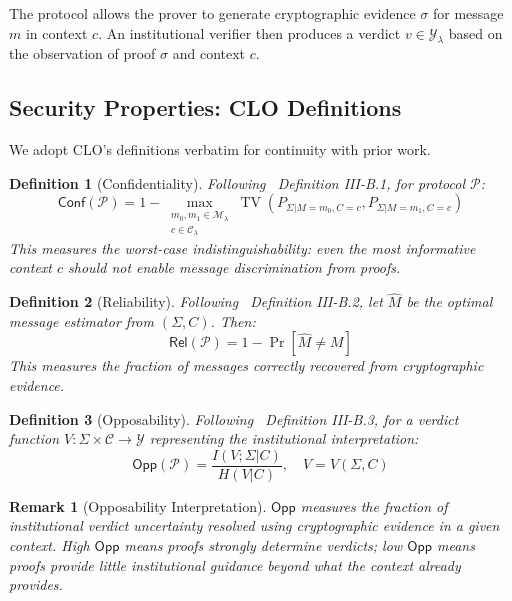 \documentclass{ieeeaccess}
\newcommand{\Conf}{\mathsf{Conf}}
\newcommand{\Rel}{\mathsf{Rel}}
\newcommand{\Opp}{\mathsf{Opp}}
\DeclareMathOperator{\TV}{TV}
\newtheorem{definition}{Definition}[subsection]
\newtheorem{remark}{Remark}[subsection]
\begin{document}
The protocol allows the prover to generate cryptographic evidence $\sigma$ for message $m$ in context $c$. An institutional verifier then produces a verdict $v \in \mathcal{Y}_\lambda$ based on the observation of proof $\sigma$ and context $c$.

\subsection{Security Properties: CLO Definitions}

We adopt CLO's definitions verbatim for continuity with prior work.

\begin{definition}[Confidentiality]\label{def:confidentiality}
Following~\cite{Minka2026CLO} Definition III-B.1, for protocol $\mathcal{P}$:
\begin{equation}
\Conf(\mathcal{P}) = 1 - \max_{\substack{m_0, m_1 \in \mathcal{M}_\lambda \\ c \in \mathcal{C}_\lambda}} 
    \TV(P_{\Sigma|M=m_0,C=c}, P_{\Sigma|M=m_1,C=c})
\end{equation}
This measures the worst-case indistinguishability: even the most informative context $c$ should not enable message discrimination from proofs.
\end{definition}

\begin{definition}[Reliability]\label{def:reliability}
Following~\cite{Minka2026CLO} Definition III-B.2, let $\hat{M}$ be the optimal message estimator from $(\Sigma, C)$. Then:
\begin{equation}
\Rel(\mathcal{P}) = 1 - \Pr[\hat{M} \neq M]
\end{equation}
This measures the fraction of messages correctly recovered from cryptographic evidence.
\end{definition}

\begin{definition}[Opposability]\label{def:opposability}
Following~\cite{Minka2026CLO} Definition III-B.3, for a verdict function $V: \Sigma \times \mathcal{C} \to \mathcal{Y}$ representing the institutional interpretation:
\begin{equation}
\Opp(\mathcal{P}) = \frac{I(V;\Sigma|C)}{H(V|C)}, \quad V = V(\Sigma, C)
\end{equation}
\end{definition}

\begin{remark}[Opposability Interpretation]
$\Opp$ measures the fraction of institutional verdict uncertainty resolved using cryptographic evidence in a given context. High $\Opp$ means proofs strongly determine verdicts; low $\Opp$ means proofs provide little institutional guidance beyond what the context already provides.
\end{remark}
\end{document}
